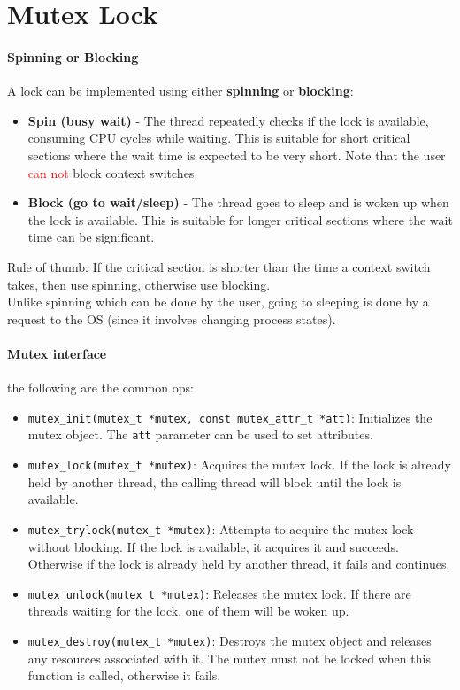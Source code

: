 \documentclass[openany,12pt]{book}
\newcommand{\code}[1]{\texttt{#1}}
\newcommand{\red}[1]{\textcolor{Red}{#1}}
\begin{document}
\section*{Mutex Lock}



\paragraph{Spinning or Blocking} A lock can be implemented using either \textbf{spinning} or \textbf{blocking}:
\begin{itemize}
  \item \textbf{Spin (busy wait)} - The thread repeatedly checks if the lock is available, consuming CPU cycles while waiting. This is suitable for short critical sections where the wait time is expected to be very short. Note that the user \red{can not} block context switches.

  \item \textbf{Block (go to wait/sleep)} - The thread goes to sleep and is woken up when the lock is available. This is suitable for longer critical sections where the wait time can be significant.
\end{itemize}
Rule of thumb: If the critical section is shorter than the time a context switch takes, then use spinning, otherwise use blocking.\\
Unlike spinning which can be done by the user, going to sleeping is done by a request to the OS (since it involves changing process states).


\paragraph{Mutex interface} the following are the common ops:
\begin{itemize}
  \item \code{mutex\_init(mutex\_t *mutex, const mutex\_attr\_t *att)}: Initializes the mutex object. The \code{att} parameter can be used to set attributes.

  \item \code{mutex\_lock(mutex\_t *mutex)}: Acquires the mutex lock. If the lock is already held by another thread, the calling thread will block until the lock is available.

  \item \code{mutex\_trylock(mutex\_t *mutex)}: Attempts to acquire the mutex lock without blocking. If the lock is available, it acquires it and succeeds. Otherwise if the lock is already held by another thread, it fails and continues.

  \item \code{mutex\_unlock(mutex\_t *mutex)}: Releases the mutex lock. If there are threads waiting for the lock, one of them will be woken up.

  \item \code{mutex\_destroy(mutex\_t *mutex)}: Destroys the mutex object and releases any resources associated with it. The mutex must not be locked when this function is called, otherwise it fails.
\end{itemize}
\end{document}
